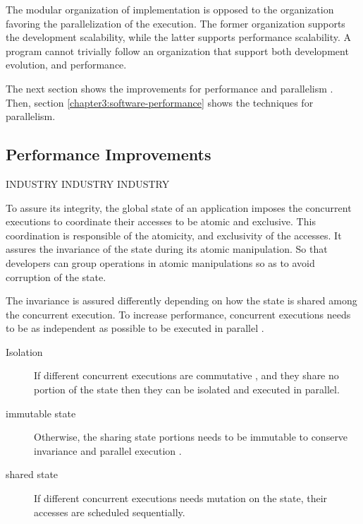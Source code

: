 







The modular organization of implementation is opposed to the organization favoring the parallelization of the execution.
The former organization supports the development scalability, while the latter supports performance scalability.
A program cannot trivially follow an organization that support both development evolution, and performance.

The next section shows the improvements for performance and parallelism .
Then, section \ref{chapter3:software-performance} shows the techniques for parallelism.

\subsection{Performance Improvements} \label{chapter3:software-maintainability:performance}

INDUSTRY INDUSTRY INDUSTRY

To assure its integrity, the global state of an application imposes the concurrent executions to coordinate their accesses to be atomic and exclusive.
This coordination is responsible of the atomicity, and exclusivity of the accesses.
It assures the invariance of the state during its atomic manipulation.
So that developers can group operations in atomic manipulations so as to avoid corruption of the state.

The invariance is assured differently depending on how the state is shared among the concurrent execution.
To increase performance, concurrent executions needs to be as independent as possible to be executed in parallel .
\begin{description}
  \item[Isolation] If different concurrent executions are commutative \cite{Rinard1996,Clements2013a}, and they share no portion of the state then they can be isolated and executed in parallel.
  \item[immutable state] Otherwise, the sharing state portions needs to be immutable to conserve invariance and parallel execution \cite{Gordon2012,Matsakis2012a}.
  \item[shared state] If different concurrent executions needs mutation on the state, their accesses are scheduled sequentially.
\end{description}

